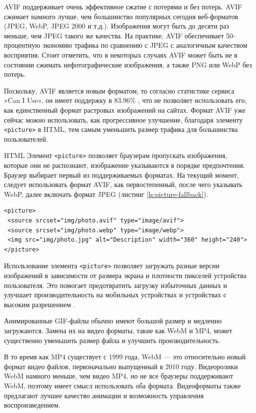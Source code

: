 AVIF поддерживает очень эффективное сжатие с потерями и без потерь. AVIF сжимает намного лучше, чем большинство популярных сегодня веб-форматов (JPEG, WebP, JPEG 2000 и т.д.). Изображения могут быть до десяти раз меньше, чем JPEG такого же качества. На практике, AVIF обеспечивает 50-процентную экономию трафика по сравнению с JPEG с аналогичным качеством восприятия. Стоит отметить, что в некоторых случаях AVIF может быть не в состоянии сжимать нефотографические изображения, а также PNG или WebP без потерь.

Поскольку, AVIF является новым форматом, то согласно статистике сервиса «Can I Use», он имеет поддержку в 83.96\% \cite{caniuseavif}, что не позволяет использовать его, как единственный формат растровых изображений на сайтах. Формат AVIF уже сейчас можно использовать, как прогрессивное улучшение, благодаря элементу  \verb|<picture>| в HTML, тем самым уменьшить размер трафика для большинства пользователей.

HTML Элемент \verb|<picture>| позволяет браузерам пропускать изображения, которые они не распознают, изображение указываются в порядке предпочтения. Браузер выбирает первый из поддерживаемых форматах. На текущий момент, следует использовать формат AVIF, как первостепенный, после чего указывать WebP, далее включать формат JPEG (листинг \ref{ls:picture-fallback}).

\begin{lstlisting}[caption={Использования HTML элемента <picture> для современных форматов изображений}, label={ls:picture-fallback}]
<picture>
 <source srcset="img/photo.avif" type="image/avif">
 <source srcset="img/photo.webp" type="image/webp">
 <img src="img/photo.jpg" alt="Description" width="360" height="240">
</picture>
\end{lstlisting}

Использование элемента \verb|<picture>| позволяет загружать разные версии изображений в зависимости от размера экрана и плотности пикселей устройства пользователя. Это помогает предотвратить загрузку избыточных данных и улучшает производительность на мобильных устройствах и устройствах с высоким разрешением \cite{imagesopt}.

Анимированные GIF-файлы обычно имеют большой размер и медленно загружаются. Замена их на видео форматы, такие как WebM и MP4, может существенно уменьшить размер файла и улучшить производительность.

В то время как MP4 существует с 1999 года, WebM — это относительно новый формат видео файлов, первоначально выпущенный в 2010 году. Видеоролики WebM намного меньше, чем видео MP4, но не все браузеры поддерживают WebM, поэтому имеет смысл использовать оба формата. Видеоформаты также предлагают лучшее качество анимации и возможность управления воспроизведением.

